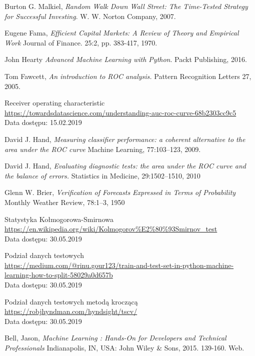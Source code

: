 \documentclass[a4paper, twoside, 11pt, openright]{article}
\begin{document}
\begin{thebibliography}{9}
  Burton G. Malkiel,
  \textit{Random Walk Down Wall Street: The Time-Tested Strategy for Successful Investing}.
  W. W. Norton Company,
  2007.

  Eugene Fama,
  \textit{Efficient Capital Markets: A Review of Theory and Empirical Work}
  Journal of Finance. 25:2, pp. 383-417, 1970.

  John Hearty
  \textit{Advanced Machine Learning with Python}.
  Packt Publishing,
  2016.

	Tom Fawcett, 
  \textit{An introduction to ROC analysis.}
  Pattern Recognition Letters 27,
  2005.

	Receiver operating characteristic
	\\\url{https://towardsdatascience.com/understanding-auc-roc-curve-68b2303cc9c5} 
	\\Data dostępu: 15.02.2019

	David J. Hand, 
  \textit{Measuring classifier performance: a coherent alternative to the area under the ROC curve}
  Machine Learning, 77:103–123, 2009.

	David J. Hand, 
  \textit{Evaluating diagnostic tests: the area under the ROC curve and the balance of errors.}
 Statistics in Medicine, 29:1502–1510, 2010

	Glenn W. Brier, 
  \textit{Verification of Forecasts Expressed in Terms of Probability}
  Monthly Weather Review, 78:1–3, 1950

	Statystyka Kołmogorowa-Smirnowa
 \\\url{https://en.wikipedia.org/wiki/Kolmogorov%E2%80%93Smirnov_test}
 \\Data dostępu: 30.05.2019


 Podział danych testowych 
 \\\url{https://medium.com/@rinu.gour123/train-and-test-set-in-python-machine-learning-how-to-split-58029a0d657b} 
 \\Data dostępu: 30.05.2019
 
 
 Podział danych testowych metodą kroczącą 
 \\\url{https://robjhyndman.com/hyndsight/tscv/}
\\Data dostępu: 30.05.2019
 
	Bell, Jason, \textit{Machine Learning : Hands-On for Developers and Technical Professionals}  Indianapolis, IN, USA: John Wiley \& Sons, 2015. 139-160. Web.
	

\end{thebibliography}
\end{document}
